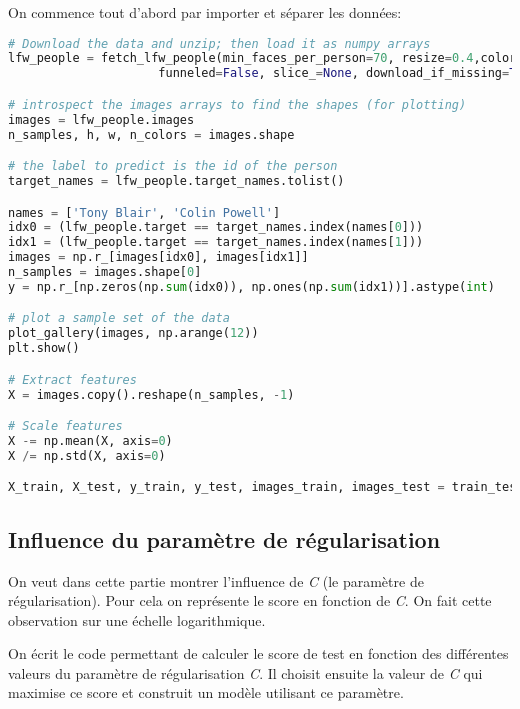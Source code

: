 \documentclass[a4paper, 12pt]{article}
\begin{document}
On commence tout d'abord par importer et séparer les données: 
\begin{lstlisting}[language=Python, caption=Importation des données]
# Download the data and unzip; then load it as numpy arrays
lfw_people = fetch_lfw_people(min_faces_per_person=70, resize=0.4,color=True, 
                     funneled=False, slice_=None, download_if_missing=True)

# introspect the images arrays to find the shapes (for plotting)
images = lfw_people.images
n_samples, h, w, n_colors = images.shape

# the label to predict is the id of the person
target_names = lfw_people.target_names.tolist()

names = ['Tony Blair', 'Colin Powell']
idx0 = (lfw_people.target == target_names.index(names[0]))
idx1 = (lfw_people.target == target_names.index(names[1]))
images = np.r_[images[idx0], images[idx1]]
n_samples = images.shape[0]
y = np.r_[np.zeros(np.sum(idx0)), np.ones(np.sum(idx1))].astype(int)

# plot a sample set of the data
plot_gallery(images, np.arange(12))
plt.show()

# Extract features
X = images.copy().reshape(n_samples, -1)

# Scale features
X -= np.mean(X, axis=0)
X /= np.std(X, axis=0)

X_train, X_test, y_train, y_test, images_train, images_test = train_test_split(X, y, images, test_size=0.25, random_state=0)    
\end{lstlisting}

\subsection{Influence du paramètre de régularisation}\label{subsec:influ}

On veut dans cette partie montrer l'influence de \textit{C} (le paramètre de régularisation). Pour cela on représente le score en fonction de \textit{C}. 
On fait cette observation sur une échelle logarithmique. 

On écrit le code permettant de calculer le score de test en fonction des différentes valeurs du paramètre de régularisation \textit{C}. Il choisit ensuite la valeur de \textit{C} qui maximise ce score et construit un modèle utilisant ce paramètre.
\end{document}
